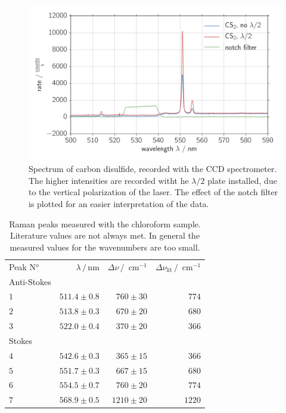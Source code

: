 \begin{figure}[htpb]
    \centering
    \includegraphics[width=0.8\linewidth]{analysis/figures/ccd_cs2_spectra}
    \caption{
        Spectrum of carbon disulfide, recorded with the CCD spectrometer. 
        The higher intensities are recorded witht he $\lambda / 2$ plate installed, 
        due to the vertical polarization of the laser. The effect of the notch filter
        is plotted for an easier interpretation of the data.}
    \label{fig:ccd_cs2_spectra}
\end{figure}

\begin{table}[htpb]
    \centering
    \caption{
        Raman peaks measured with the chloroform sample. Literature values are not always met. In general the 
        measured values for the wavenumbers are too small.
        }
    \label{tab:ccd_chcl3_peaks}
    \begin{tabular}{l r r r}
        \rowcolor{LightCyan} Peak N$^o$ & $\lambda \, / \, \text{nm}$ &
        $\Delta \nu \, / \, \text{ cm}^{-1}$ & 
        $\Delta \nu_\text{lit} \, / \, \text{ cm}^{-1}$ \\
        \cellcolor{LightCyan}Anti-Stokes &&& \\
        \cellcolor{LightCyan}$1$ & $511.4 \pm 0.8$ & $760 \pm 30$ & $774$   \\
        \cellcolor{LightCyan}$2$ & $513.8 \pm 0.3$ & $670 \pm 20$ & $680$   \\
        \cellcolor{LightCyan}$3$ & $522.0 \pm 0.4$ & $370 \pm 20$ & $366$   \\
        \cellcolor{LightCyan}Stokes &&& \\
        \cellcolor{LightCyan}$4$ & $542.6 \pm 0.3$ & $365 \pm 15$ & $366$   \\
        \cellcolor{LightCyan}$5$ & $551.7 \pm 0.3$ & $667 \pm 15$ & $680$   \\
        \cellcolor{LightCyan}$6$ & $554.5 \pm 0.7$ & $760 \pm 20$ & $774$   \\
        \cellcolor{LightCyan}$7$ & $568.9 \pm 0.5$ & $1210 \pm 20$ & $1220$   
    \end{tabular}
\end{table}

